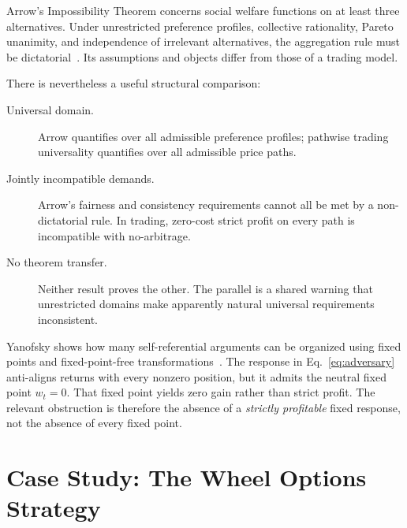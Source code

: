 \documentclass[aps,pra,reprint,superscriptaddress,amsmath,amssymb,floatfix]{revtex4-2}
\theoremstyle{plain}
\theoremstyle{definition}
\theoremstyle{remark}
\begin{document}
Arrow's Impossibility Theorem concerns social welfare functions on at least
three alternatives. Under unrestricted preference profiles, collective
rationality, Pareto unanimity, and independence of irrelevant alternatives,
the aggregation rule must be dictatorial~\cite{Arrow1963}. Its assumptions and
objects differ from those of a trading model.

There is nevertheless a useful structural comparison:
\begin{description}
  \item[Universal domain.] Arrow quantifies over all admissible preference
  profiles; pathwise trading universality quantifies over all admissible price
  paths.
  \item[Jointly incompatible demands.] Arrow's fairness and consistency
  requirements cannot all be met by a non-dictatorial rule. In trading,
  zero-cost strict profit on every path is incompatible with no-arbitrage.
  \item[No theorem transfer.] Neither result proves the other. The parallel is
  a shared warning that unrestricted domains make apparently natural
  universal requirements inconsistent.
\end{description}

Yanofsky shows how many self-referential arguments can be organized using
fixed points and fixed-point-free transformations~\cite{Yanofsky-BSL:9051621}.
The response in Eq.~\eqref{eq:adversary} anti-aligns returns with every
nonzero position, but it admits the neutral fixed point \(w_t=0\). That fixed
point yields zero gain rather than strict profit. The relevant obstruction is
therefore the absence of a \emph{strictly profitable} fixed response, not the
absence of every fixed point.

\section{Case Study: The Wheel Options Strategy}
\label{sec:wheel}
\end{document}
